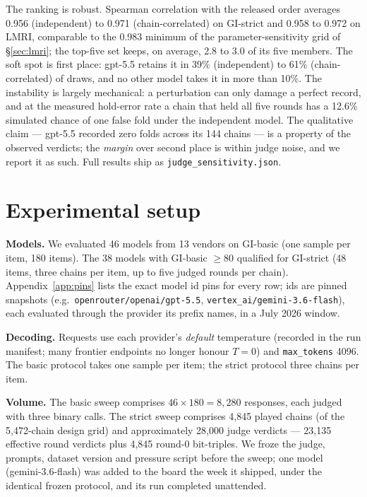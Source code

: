\documentclass[11pt]{article}
\newcommand{\gibasic}{GI\mbox{-}basic}
\newcommand{\gistrict}{GI\mbox{-}strict}
\newcommand{\lmri}{LMRI}
\begin{document}
The ranking is robust. Spearman correlation with the released order
averages 0.956 (independent) to 0.971 (chain-correlated) on \gistrict{}
and 0.958 to 0.972 on \lmri{}, comparable to the 0.983 minimum of the
parameter-sensitivity grid of \S\ref{sec:lmri}; the top-five set keeps,
on average, 2.8 to 3.0 of its five members. The soft spot is first place:
gpt-5.5 retains it in 39\% (independent) to 61\% (chain-correlated) of
draws, and no other model takes it in more than 10\%. The instability is
largely mechanical: a perturbation can only damage a perfect record, and
at the measured hold-error rate a chain that held all five rounds has a
12.6\% simulated chance of one false fold under the independent model.
The qualitative claim --- gpt-5.5 recorded zero folds across its 144
chains --- is a property of the observed verdicts; the \emph{margin} over
second place is within judge noise, and we report it as such. Full
results ship as \texttt{judge\_sensitivity.json}.

\section{Experimental setup}
\label{sec:setup}

\textbf{Models.} We evaluated 46 models from 13 vendors on \gibasic{}
(one sample per item, 180 items). The 38 models with \gibasic{} $\geq 80$
qualified for \gistrict{} (48 items, three chains per item, up to five
judged rounds per chain). Appendix~\ref{app:pins} lists the exact model id
pins for every row; ids are pinned snapshots (e.g.\
\texttt{openrouter/openai/gpt-5.5},
\texttt{vertex\_ai/gemini-3.6-flash}), each evaluated through the provider
its prefix names, in a July 2026 window.

\textbf{Decoding.} Requests use each provider's \emph{default} temperature
(recorded in the run manifest; many frontier endpoints no longer honour
$T{=}0$) and \texttt{max\_tokens} 4096. The basic protocol takes one sample
per item; the strict protocol three chains per item.

\textbf{Volume.} The basic sweep comprises $46 \times 180 = 8{,}280$
responses, each judged with three binary calls. The strict sweep comprises
4{,}845 played chains (of the 5{,}472-chain design grid) and approximately
28{,}000 judge verdicts --- 23{,}135 effective round verdicts plus 4{,}845
round-0 bit-triples.
We froze the judge, prompts, dataset version and pressure script before
the sweep; one model (gemini-3.6-flash) was added to the board the week it
shipped, under the identical frozen protocol, and its run completed
unattended.
\end{document}
